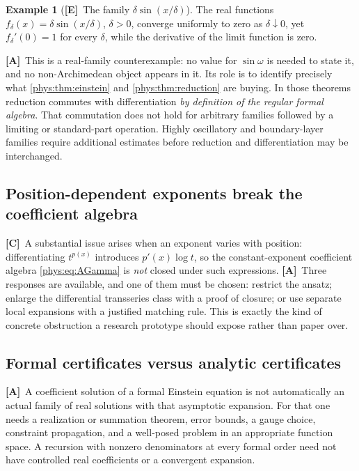 \documentclass[11pt,letterpaper]{article}
\numberwithin{equation}{section}
\theoremstyle{definition}
\newtheorem{example}[theorem]{Example}
\theoremstyle{remark}
\newcommand{\TE}{\textcolor{TierE}{\textsf{\bfseries[E]}}}
\newcommand{\TC}{\textcolor{TierC}{\textsf{\bfseries[C]}}}
\newcommand{\TA}{\textcolor{TierA}{\textsf{\bfseries[A]}}}
\begin{document}
\begin{example}[\TE\ The family $\delta\sin(x/\delta)$]
\label{phys:ex:oscillatory}
The real functions $f_{\delta}(x)=\delta\sin(x/\delta)$, $\delta>0$, converge
uniformly to zero as $\delta\downarrow0$, yet $f_{\delta}'(0)=1$ for every
$\delta$, while the derivative of the limit function is zero.
\end{example}

\TA\ This is a real-family counterexample: no value for $\sin\omega$ is needed
to state it, and no non-Archimedean object appears in it. Its role is to
identify precisely what \cref{phys:thm:einstein} and \cref{phys:thm:reduction}
are buying. In those theorems reduction commutes with differentiation
\emph{by definition of the regular formal algebra}. That commutation does not
hold for arbitrary families followed by a limiting or standard-part operation.
Highly oscillatory and boundary-layer families require additional estimates
before reduction and differentiation may be interchanged.

\subsection{Position-dependent exponents break the coefficient algebra}
\label{phys:sub:varyingexponent}

\TC\ A substantial issue arises when an exponent varies with position:
differentiating $t^{p(x)}$ introduces $p'(x)\log t$, so the constant-exponent
coefficient algebra \eqref{phys:eq:AGamma} is \emph{not} closed under such
expressions. \TA\ Three responses are available, and one of them must be
chosen: restrict the ansatz; enlarge the differential transseries class with a
proof of closure; or use separate local expansions with a justified matching
rule. This is exactly the kind of concrete obstruction a research prototype
should expose rather than paper over.

\subsection{Formal certificates versus analytic certificates}
\label{phys:sub:certificates}

\TA\ A coefficient solution of a formal Einstein equation is not automatically
an actual family of real solutions with that asymptotic expansion. For that one
needs a realization or summation theorem, error bounds, a gauge choice,
constraint propagation, and a well-posed problem in an appropriate function
space. A recursion with nonzero denominators at every formal order need not
have controlled real coefficients or a convergent expansion.
\end{document}
